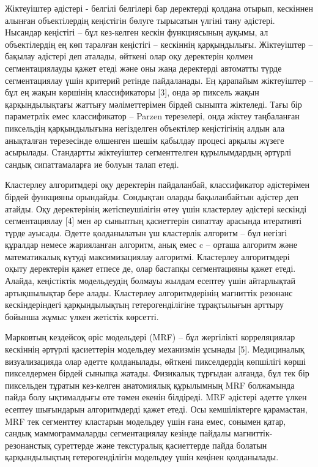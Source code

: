 \begin{multicols}{2}
Жіктеуіштер әдістері - белгілі белгілері бар деректерді қолдана отырып,
кескіннен алынған объектілердің кеңістігін бөлуге тырысатын үлгіні тану
әдістері. Нысандар кеңістігі -- бұл кез-келген кескін функциясының
ауқымы, ал объектілердің ең көп таралған кеңістігі -- кескіннің
қарқындылығы. Жіктеуіштер -- бақылау әдістері деп аталады, өйткені олар
оқу деректерін қолмен сегментациялауды қажет етеді және оны жаңа
деректерді автоматты түрде сегментациялау үшін критерий ретінде
пайдаланады. Ең қарапайым жіктеуіштер -- бұл ең жақын көршінің
классификаторы {[}3{]}, онда әр пиксель жақын қарқындылықтағы жаттығу
мәліметтерімен бірдей сыныпта жіктеледі. Тағы бір параметрлік емес
классификатор -- Parzen терезелері, онда жіктеу таңбаланған пиксельдің
қарқындылығына негізделген объектілер кеңістігінің алдын ала анықталған
терезесінде өлшенген шешім қабылдау процесі арқылы жүзеге асырылады.
Стандартты жіктеуіштер сегменттелген құрылымдардың әртүрлі сандық
сипаттамаларға ие болуын талап етеді.

Кластерлеу алгоритмдері оқу деректерін пайдаланбай, классификатор
әдістерімен бірдей функцияны орындайды. Сондықтан оларды бақыланбайтын
әдістер деп атайды. Оқу деректерінің жетіспеушілігін өтеу үшін
кластерлеу әдістері кескінді сегментациялау {[}4{]} мен әр сыныптың
қасиеттерін сипаттау арасында итеративті түрде ауысады. Әдетте
қолданылатын үш кластерлік алгоритм -- бұл негізгі құралдар немесе
жарияланған алгоритм, анық емес c -- орташа алгоритм және математикалық
күтуді максимизациялау алгоритмі. Кластерлеу алгоритмдері оқыту
деректерін қажет етпесе де, олар бастапқы сегментацияны қажет етеді.
Алайда, кеңістіктік модельдеудің болмауы жылдам есептеу үшін айтарлықтай
артықшылықтар бере алады. Кластерлеу алгоритмдерінің магниттік резонанс
кескіндеріндегі қарқындылықтың гетерогенділігіне тұрақтылығын арттыру
бойынша жұмыс үлкен жетістік көрсетті.

Марковтың кездейсоқ өріс модельдері (MRF) -- бұл жергілікті
корреляциялар кескіннің әртүрлі қасиеттерін модельдеу механизмін ұсынады
{[}5{]}. Медициналық визуализацияда олар әдетте қолданылады, өйткені
пикселдердің көпшілігі көрші пикселдермен бірдей сыныпқа жатады.
Физикалық тұрғыдан алғанда, бұл тек бір пиксельден тұратын кез-келген
анатомиялық құрылымның MRF болжамында пайда болу ықтималдығы өте төмен
екенін білдіреді. MRF әдістері әдетте үлкен есептеу шығындарын
алгоритмдерді қажет етеді. Осы кемшіліктерге қарамастан, MRF тек
сегменттеу кластарын модельдеу үшін ғана емес, сонымен қатар, сандық
маммограммаларды сегментациялау кезінде пайдалы магниттік-резонанстық
суреттерде және текстуралық қасиеттерде пайда болатын қарқындылықтың
гетерогенділігін модельдеу үшін кеңінен қолданылады.


\end{multicols}
